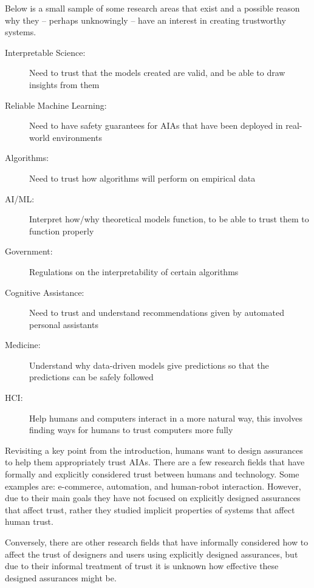     Below is a small sample of some research areas that exist and a possible reason why they -- perhaps unknowingly -- have an interest in creating trustworthy systems.
%
    \begin{description}
        \item [Interpretable Science:] Need to trust that the models created are valid, and be able to draw insights from them
        \item [Reliable Machine Learning:] Need to have safety guarantees for AIAs that have been deployed in real-world environments
        \item [Algorithms:] Need to trust how algorithms will perform on empirical data
        \item [AI/ML:] Interpret how/why theoretical models function, to be able to trust them to function properly
        \item [Government:] Regulations on the interpretability of certain algorithms
        \item [Cognitive Assistance:] Need to trust and understand recommendations given by automated personal assistants
        \item [Medicine:] Understand why data-driven models give predictions so that the predictions can be safely followed
        \item [HCI:] Help humans and computers interact in a more natural way, this involves finding ways for humans to trust computers more fully 
    \end{description}

    Revisiting a key point from the introduction, humans want to design assurances to help them appropriately trust AIAs. There are a few research fields that have formally and explicitly considered trust between humans and technology. Some examples are: e-commerce, automation, and human-robot interaction. However, due to their main goals they have not focused on explicitly designed assurances that affect trust, rather they studied implicit properties of systems that affect human trust.

    Conversely, there are other research fields that have informally considered how to affect the trust of designers and users using explicitly designed assurances, but due to their informal treatment of trust it is unknown how effective these designed assurances might be.

